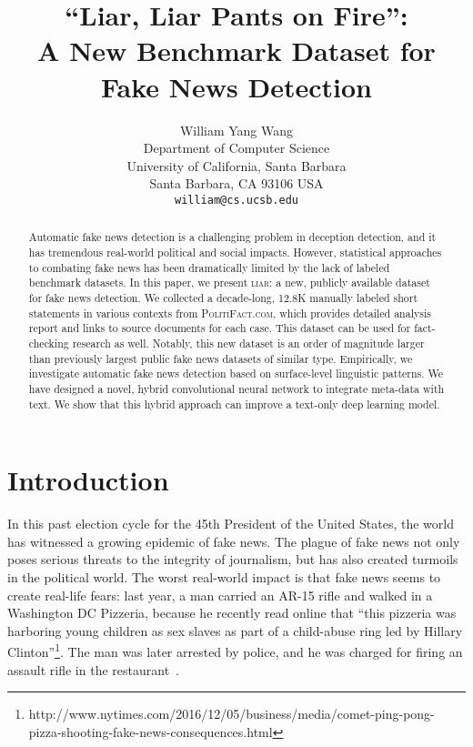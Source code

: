\documentclass[11pt,a4paper]{article}
\title{``Liar, Liar Pants on Fire'':\\ 
A New Benchmark Dataset for Fake News Detection}
\author{William Yang Wang \\
  Department of Computer Science \\
  University of California, Santa Barbara \\
  Santa Barbara, CA 93106 USA \\
  {\tt william@cs.ucsb.edu}}
\date{}
\begin{document}
\maketitle
\begin{abstract}
Automatic fake news detection is a challenging problem in deception detection, and it has tremendous real-world political and social impacts. However, statistical approaches to combating fake news has been dramatically limited by the lack of labeled benchmark datasets. In this paper, we present \textsc{liar}: a new, publicly available dataset for fake news detection. We collected a decade-long, 12.8K manually labeled short statements in various contexts from \textsc{PolitiFact.com}, which provides detailed analysis report and links to source documents for each case. This dataset can be used for fact-checking research as well. Notably, this new dataset is an order of magnitude larger than previously largest public fake news datasets of similar type. Empirically, we investigate automatic fake news detection based on surface-level linguistic patterns. We have designed a novel, hybrid convolutional neural network to integrate meta-data with text. We show that this hybrid approach can improve a text-only deep learning model.  

\end{abstract}
\section{Introduction}

In this past election cycle for the 45th President of the United States, the world has witnessed a growing epidemic of fake news. The plague of fake news not only poses serious threats to the integrity of journalism, but has also created turmoils in the political world. The worst real-world impact is that fake news seems to create real-life fears: last year, a man carried an AR-15 rifle and walked in a Washington DC Pizzeria, because he recently read online that ``this pizzeria was harboring young children as sex slaves as part of a child-abuse ring led by Hillary Clinton''\footnote{http://www.nytimes.com/2016/12/05/business/media/comet-ping-pong-pizza-shooting-fake-news-consequences.html}. The man was later arrested by police, and he was charged for firing an assault rifle in the restaurant~\cite{nyt2016}.
\end{document}
